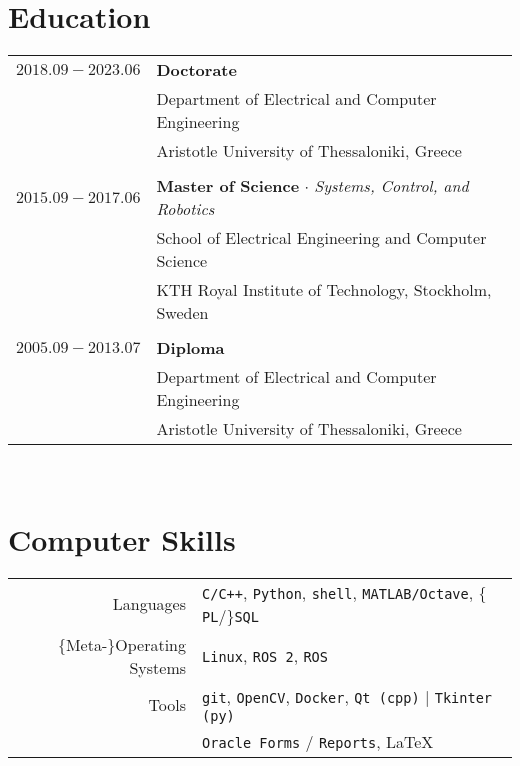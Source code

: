 \documentclass[a4paper,10pt,twoside]{article}
\begin{document}

\section{Education}

\begin{tabular}{rp{12cm}}
$2018.09 - 2023.06$ & \textbf{Doctorate} \\
                    & Department of Electrical and Computer Engineering\\
                    & Aristotle University of Thessaloniki, Greece \\
&\\
$2015.09 - 2017.06$ & \textbf{Master of Science} $\cdot$ \textit{Systems, Control, and Robotics}\\
                    & School of Electrical Engineering and Computer Science\\
                    & KTH Royal Institute of Technology, Stockholm, Sweden\\
&\\
$2005.09 - 2013.07$ & \textbf{Diploma}\\
                    & Department of Electrical and Computer Engineering\\
                    & Aristotle University of Thessaloniki, Greece \\
\end{tabular}\\


\section{Computer Skills}

\begin{tabular}{rp{12cm}}
Languages & \texttt{C/C++}, \texttt{Python}, \texttt{shell}, \texttt{MATLAB/Octave}, $\{$\texttt{PL}/$\}$\texttt{SQL}\\
$\{$Meta-$\}$Operating Systems & \texttt{Linux}, \texttt{ROS 2}, \texttt{ROS} \\
Tools & \texttt{git}, \texttt{OpenCV}, \texttt{Docker}, \texttt{Qt (cpp)} | \texttt{Tkinter (py)}\\
      & \texttt{Oracle Forms} / \texttt{Reports}, \LaTeX\\
\end{tabular} \\
\end{document}
